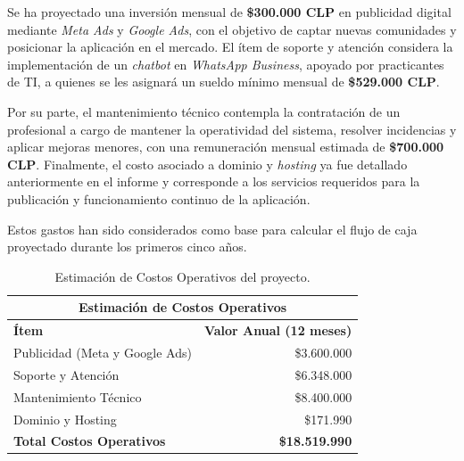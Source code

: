 {Se ha proyectado una inversión mensual de \textbf{\$300.000 CLP} en publicidad digital mediante \textit{Meta Ads} y \textit{Google Ads}, con el objetivo de captar nuevas comunidades y posicionar la aplicación en el mercado. El ítem de soporte y atención considera la implementación de un \textit{chatbot} en \textit{WhatsApp Business}, apoyado por practicantes de TI, a quienes se les asignará un sueldo mínimo mensual de \textbf{\$529.000 CLP}.

Por su parte, el mantenimiento técnico contempla la contratación de un profesional a cargo de mantener la operatividad del sistema, resolver incidencias y aplicar mejoras menores, con una remuneración mensual estimada de \textbf{\$700.000 CLP}. Finalmente, el costo asociado a dominio y \textit{hosting} ya fue detallado anteriormente en el informe y corresponde a los servicios requeridos para la publicación y funcionamiento continuo de la aplicación.

Estos gastos han sido considerados como base para calcular el flujo de caja proyectado durante los primeros cinco años.



\begin{table}[H]

    \centering
    
    \caption{Estimación de Costos Operativos del proyecto.}
    
    \label{tab:costos_operativos_y1}
    
    \begin{tabular}{|l|r|}
    
    \hline
    \multicolumn{2}{|c|}{\textbf{Estimación de Costos Operativos}}\\
    \hline
    \textbf{Ítem} & \textbf{Valor Anual (12 meses)}\\
    \hline
    
    Publicidad (Meta y Google Ads) & \$3.600.000\\
    \hline
    Soporte y Atención & \$6.348.000\\
    \hline
    Mantenimiento Técnico & \$8.400.000\\
    \hline
    Dominio y Hosting & \$171.990\\
    \hline
    \textbf{Total Costos Operativos} & \textbf{\$18.519.990}\\
    \hline
    

\end{tabular}
\end{table}}
